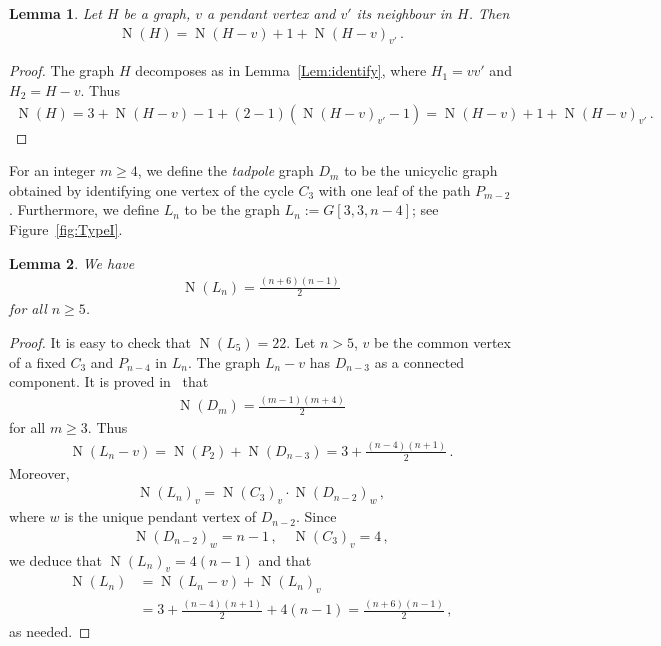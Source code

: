 \documentclass[a4paper,12pt]{amsart}
\newtheorem{lemma}{Lemma}
\theoremstyle{remark}
\DeclareMathOperator{\N}{N}
\begin{document}
\medskip

\begin{lemma}\label{Lemm:vtovprime}
Let $H$ be a graph, $v$ a pendant vertex and $v'$ its neighbour in $H$. Then
\begin{align*}
\N(H)=\N(H-v)+1+\N(H-v)_{v'}\,.
\end{align*}
\end{lemma}

\begin{proof}
The graph $H$ decomposes as in Lemma~\ref{Lem:identify}, where $H_1=vv'$ and $H_2=H-v$. Thus 
\begin{align*}
\N(H)=3 +\N(H-v) -1 + (2 -1 )(\N(H-v)_{v'} -1 )=\N(H-v)+1+\N(H-v)_{v'}\,.
\end{align*}
\end{proof}

\medskip
For an integer $m\geq 4$, we define the {\it tadpole} graph $D_m$ to be the unicyclic graph obtained by identifying one vertex of the cycle $C_3$ with one leaf of the path $P_{m-2}$. Furthermore, we define $L_n$ to be the graph $L_n:=G[3,3,n-4]$; see Figure~\ref{fig:TypeI}.

\begin{lemma}\label{Lem:FormLn}
We have 
\begin{align*}
\N(L_n)=\frac{(n+6)(n-1)}{2}
\end{align*}
for all $n\geq 5$.
\end{lemma}

\begin{proof}
It is easy to check that $\N(L_5)=22$. Let $n>5$, $v$ be the common vertex of a fixed $C_3$ and $P_{n-4}$ in $L_n$. The graph $L_n -v$ has $D_{n-3}$ as a connected component. It is proved in~\cite{Audacegenral2018} that 
\begin{align*}
\N(D_m)=\frac{(m-1)(m+4)}{2}
\end{align*}
for all $m\geq 3$. Thus
\begin{align*}
\N(L_n-v)=\N(P_2)+\N(D_{n-3})=3+ \frac{(n-4)(n+1)}{2}\,.
\end{align*}
Moreover, 
\begin{align*}
\N(L_n)_v=\N(C_3)_v \cdot \N(D_{n-2})_w\,,
\end{align*}
where $w$ is the unique pendant vertex of $D_{n-2}$. Since
\begin{align*}
\N(D_{n-2})_w=n-1\,, \quad \N(C_3)_v=4\,, 
\end{align*}
we deduce that $\N(L_n)_v=4(n-1)$ and that
\begin{align*}
\N(L_n)&=\N(L_n-v)+\N(L_n)_v\\
&=3+ \frac{(n-4)(n+1)}{2}+4(n-1)=\frac{(n+6)(n-1)}{2}\,,
\end{align*}
as needed.
\end{proof}
\end{document}
